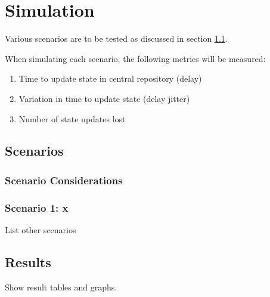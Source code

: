 \chapter{Simulation} 

Various scenarios are to be tested as discussed in section \ref{sec:scenarios}.

When simulating each scenario, the following metrics will be measured:
\begin{enumerate}
\item Time to update state in central repository (delay)
\item Variation in time to update state (delay jitter)
\item Number of state updates lost 
\end{enumerate}

\section{Scenarios}
\label{sec:scenarios}

\subsection{Scenario Considerations}

\subsection{Scenario 1: x}
List other scenarios

\section{Results}

Show result tables and graphs.

